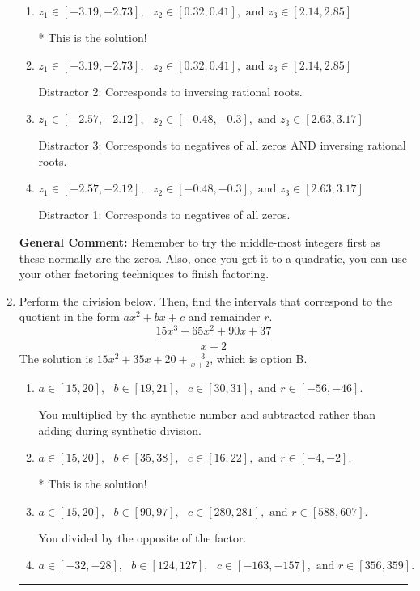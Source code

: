 \documentclass{extbook}[14pt]
\newcommand{\litem}[1]{\item #1

\rule{\textwidth}{0.4pt}}
\begin{document}
\begin{enumerate}
{\begin{enumerate}[label=\Alph*.]
 Distractor 4: Corresponds to moving factors from one rational to another.
\item \( z_1 \in [-3.19, -2.73], \text{   }  z_2 \in [0.32, 0.41], \text{   and   } z_3 \in [2.14, 2.85] \)

* This is the solution!
\item \( z_1 \in [-3.19, -2.73], \text{   }  z_2 \in [0.32, 0.41], \text{   and   } z_3 \in [2.14, 2.85] \)

 Distractor 2: Corresponds to inversing rational roots.
\item \( z_1 \in [-2.57, -2.12], \text{   }  z_2 \in [-0.48, -0.3], \text{   and   } z_3 \in [2.63, 3.17] \)

 Distractor 3: Corresponds to negatives of all zeros AND inversing rational roots.
\item \( z_1 \in [-2.57, -2.12], \text{   }  z_2 \in [-0.48, -0.3], \text{   and   } z_3 \in [2.63, 3.17] \)

 Distractor 1: Corresponds to negatives of all zeros.
\end{enumerate}

\textbf{General Comment:} Remember to try the middle-most integers first as these normally are the zeros. Also, once you get it to a quadratic, you can use your other factoring techniques to finish factoring.
}
\litem{
Perform the division below. Then, find the intervals that correspond to the quotient in the form $ax^2+bx+c$ and remainder $r$.
\[ \frac{15x^{3} +65 x^{2} +90 x + 37}{x + 2} \]The solution is \( 15x^{2} +35 x + 20 + \frac{-3}{x + 2} \), which is option B.\begin{enumerate}[label=\Alph*.]
\item \( a \in [15, 20], \text{   } b \in [19, 21], \text{   } c \in [30, 31], \text{   and   } r \in [-56, -46]. \)

 You multiplied by the synthetic number and subtracted rather than adding during synthetic division.
\item \( a \in [15, 20], \text{   } b \in [35, 38], \text{   } c \in [16, 22], \text{   and   } r \in [-4, -2]. \)

* This is the solution!
\item \( a \in [15, 20], \text{   } b \in [90, 97], \text{   } c \in [280, 281], \text{   and   } r \in [588, 607]. \)

 You divided by the opposite of the factor.
\item \( a \in [-32, -28], \text{   } b \in [124, 127], \text{   } c \in [-163, -157], \text{   and   } r \in [356, 359]. \)


\end{enumerate}}
\end{enumerate}
\end{document}
